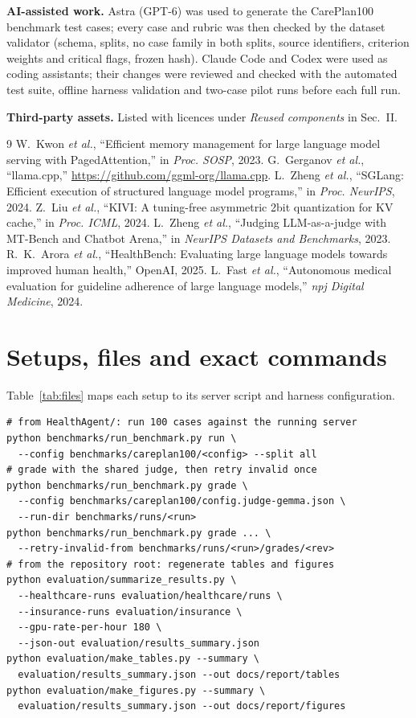 \documentclass[conference]{IEEEtran}
\begin{document}
\textbf{AI-assisted work.} Astra (GPT-6) was used to generate the CarePlan100 benchmark test cases; every case and rubric was then checked by the dataset validator (schema, splits, no case family in both splits, source identifiers, criterion weights and critical flags, frozen hash). Claude Code and Codex were used as coding assistants; their changes were reviewed and checked with the automated test suite, offline harness validation and two-case pilot runs before each full run.

\textbf{Third-party assets.} Listed with licences under \emph{Reused components} in Sec.~II.

\begin{thebibliography}{9}
 W.~Kwon \emph{et al.}, ``Efficient memory management for large language model serving with PagedAttention,'' in \emph{Proc. SOSP}, 2023.
 G.~Gerganov \emph{et al.}, ``llama.cpp,'' \url{https://github.com/ggml-org/llama.cpp}.
 L.~Zheng \emph{et al.}, ``SGLang: Efficient execution of structured language model programs,'' in \emph{Proc. NeurIPS}, 2024.
 Z.~Liu \emph{et al.}, ``KIVI: A tuning-free asymmetric 2bit quantization for KV cache,'' in \emph{Proc. ICML}, 2024.
 L.~Zheng \emph{et al.}, ``Judging LLM-as-a-judge with MT-Bench and Chatbot Arena,'' in \emph{NeurIPS Datasets and Benchmarks}, 2023.
 R.~K.~Arora \emph{et al.}, ``HealthBench: Evaluating large language models towards improved human health,'' OpenAI, 2025.
 L.~Fast \emph{et al.}, ``Autonomous medical evaluation for guideline adherence of large language models,'' \emph{npj Digital Medicine}, 2024.
\end{thebibliography}

\appendices
\section{Setups, files and exact commands}\label{app:commands}
Table~\ref{tab:files} maps each setup to its server script and harness configuration.

\scriptsize
\begin{verbatim}
# from HealthAgent/: run 100 cases against the running server
python benchmarks/run_benchmark.py run \
  --config benchmarks/careplan100/<config> --split all
# grade with the shared judge, then retry invalid once
python benchmarks/run_benchmark.py grade \
  --config benchmarks/careplan100/config.judge-gemma.json \
  --run-dir benchmarks/runs/<run>
python benchmarks/run_benchmark.py grade ... \
  --retry-invalid-from benchmarks/runs/<run>/grades/<rev>
# from the repository root: regenerate tables and figures
python evaluation/summarize_results.py \
  --healthcare-runs evaluation/healthcare/runs \
  --insurance-runs evaluation/insurance \
  --gpu-rate-per-hour 180 \
  --json-out evaluation/results_summary.json
python evaluation/make_tables.py --summary \
  evaluation/results_summary.json --out docs/report/tables
python evaluation/make_figures.py --summary \
  evaluation/results_summary.json --out docs/report/figures
\end{verbatim}
\end{document}
